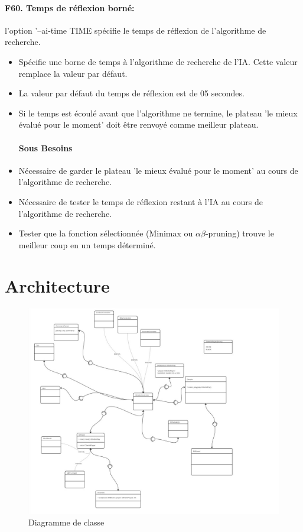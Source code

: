 \documentclass[a4paper,12pt]{article}
\begin{document}
\paragraph{F60. Temps de réflexion borné:} l'option '--ai-time TIME spécifie le temps de réflexion de l'algorithme de
recherche.
\begin{itemize}
  \item Spécifie une borne de temps à l'algorithme de recherche de l'IA. Cette valeur
        remplace la valeur par défaut.
  \item La valeur par défaut du temps de réflexion est de 05 secondes.
  \item Si le temps est écoulé avant que l'algorithme ne termine, le plateau 'le mieux
        évalué pour le moment' doit être renvoyé comme meilleur plateau.
        \paragraph{Sous Besoins}
  \item Nécessaire de garder le plateau 'le mieux évalué pour le moment' au cours de
        l'algorithme de recherche.
  \item Nécessaire de tester le temps de réflexion restant à l'IA au cours de
        l'algorithme de recherche.
  \item Tester que la fonction sélectionnée (Minimax ou $\alpha\beta$-pruning) trouve
        le meilleur coup en un temps déterminé.
\end{itemize}

\newpage
\section{Architecture}
\begin{figure}[H]
  \centering
  \includegraphics[width=1\linewidth]{images/diag_classe.jpg}
  \caption{Diagramme de classe}
  \label{fig:enter-label}
\end{figure}
\end{document}
